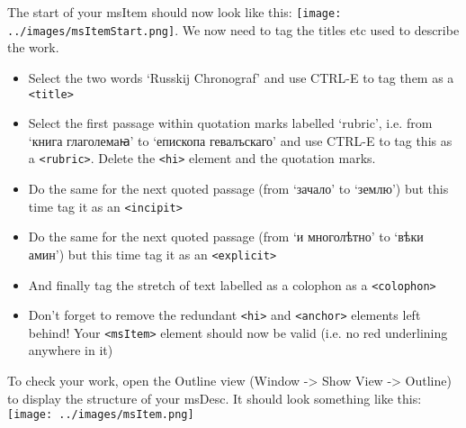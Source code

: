 \documentclass[11pt,twoside]{article}\makeatletter
\begin{document}
The start of your msItem should now look like this: \noindent\texttt{[image: ../images/msItemStart.png]}. We now need to tag the titles etc used to describe the work. \begin{itemize}
\item Select the two words ‘Russkij Chronograf’ and use CTRL-E to tag them as a \texttt{<title>}
\item Select the first passage within quotation marks labelled ‘rubric’, i.e. from ‘книга глаголемаꙗ’ to ‘епископа гевалъскаго’ and use CTRL-E to tag this as a \texttt{<rubric>}. Delete the \texttt{<hi>} element and the quotation marks.
\item Do the same for the next quoted passage (from ‘зачало’ to ‘землю’) but this time tag it as an \texttt{<incipit>}
\item Do the same for the next quoted passage (from ‘и многолѣтно’ to ‘вѣки амин’) but this time tag it as an \texttt{<explicit>}
\item And finally tag the stretch of text labelled as a colophon as a \texttt{<colophon>}
\item Don't forget to remove the redundant \texttt{<hi>} and \texttt{<anchor>} elements left behind! Your \texttt{<msItem>} element should now be valid (i.e. no red underlining anywhere in it)
\end{itemize} \par
To check your work, open the Outline view (Window -> Show View -> Outline) to display the structure of your msDesc. It should look something like this: \noindent\texttt{[image: ../images/msItem.png]}
\end{document}
